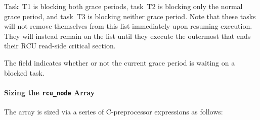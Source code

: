 Task~T1 is blocking both grace periods, task~T2 is blocking only the
normal grace period, and task~T3 is blocking neither grace period.
Note
that these tasks will not remove themselves from this list immediately
upon resuming execution.
They will instead remain on the list until they
execute the outermost  that ends their RCU
read-side critical section.

The  field indicates whether or not the current
grace period is waiting on a blocked task.

\paragraph{Sizing the \texttt{rcu\_node} Array}

The  array is sized via a series of C-preprocessor
expressions as follows:

